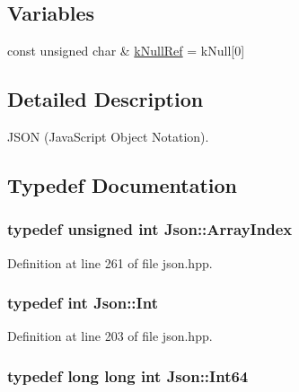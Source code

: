 \subsection*{Variables}
\begin{DoxyCompactItemize}
\item 
const unsigned char \& \hyperlink{namespace_json_ab30055b4bbd82aecaca57ccecd63bbe6}{k\-Null\-Ref} = k\-Null\mbox{[}0\mbox{]}
\end{DoxyCompactItemize}


\subsection{Detailed Description}
J\-S\-O\-N (Java\-Script Object Notation). 

\subsection{Typedef Documentation}
\hypertarget{namespace_json_a8048e741f2177c3b5d9ede4a5b8c53c2}{
\subsubsection[{Array\-Index}]{\setlength{\rightskip}{0pt plus 5cm}typedef unsigned int {\bf Json\-::\-Array\-Index}}}\label{namespace_json_a8048e741f2177c3b5d9ede4a5b8c53c2}


Definition at line 261 of file json.\-hpp.

\hypertarget{namespace_json_a08122e8005b706d982e48cca1e2119c7}{
\subsubsection[{Int}]{\setlength{\rightskip}{0pt plus 5cm}typedef int {\bf Json\-::\-Int}}}\label{namespace_json_a08122e8005b706d982e48cca1e2119c7}


Definition at line 203 of file json.\-hpp.

\hypertarget{namespace_json_ab7b47d2905da3b4ae60e4e800ec9ae5f}{
\subsubsection[{Int64}]{\setlength{\rightskip}{0pt plus 5cm}typedef long long int {\bf Json\-::\-Int64}}}\label{namespace_json_ab7b47d2905da3b4ae60e4e800ec9ae5f}


